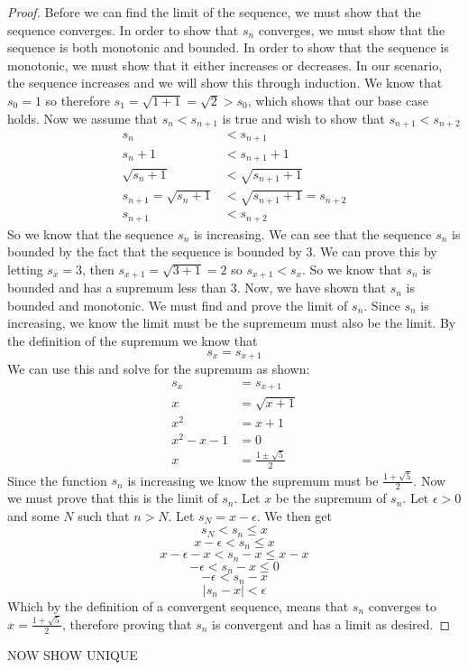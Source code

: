 \begin{proof}
Before we can find the limit of the sequence, we must show that the sequence converges. In order to show that $s_n$ converges, we must show that the sequence is both monotonic and bounded. In order to show that the sequence is monotonic, we must show that it either increases or decreases. In our scenario, the sequence increases and we will show this through induction. We know that $s_0 = 1$ so therefore $s_1 = \sqrt{1 + 1} = \sqrt{2} > s_0$, which shows that our base case holds. Now we assume that $s_n < s_{n+1}$ is true and wish to show that $s_{n+1} < s_{n+2}$
\begin{align*}
    s_n & < s_{n+1} \\
    s_n  + 1& < s_{n+1} + 1\\
    \sqrt{s_n  + 1}& < \sqrt{s_{n+1} + 1}\\
    s_{n+1}= \sqrt{s_n  + 1}& < \sqrt{s_{n+1} + 1} = s_{n+2}\\
    s_{n+1}& < s_{n+2}
\end{align*}
So we know that the sequence $s_n$ is increasing. We can see that the sequence $s_n$ is bounded by the fact that the sequence is bounded by 3. We can prove this by letting $s_x = 3$, then $s_{x+1} = \sqrt{3 + 1} = 2$ so $s_{x+1} < s_x$.
So we know that $s_n$ is bounded and has a supremum less than 3.
Now, we have shown that $s_n$ is bounded and monotonic. We must find and prove the limit of $s_n$. Since $s_n$ is increasing, we know the limit must be the supremeum must also be the limit.
By the definition of the supremum we know that $$s_x = s_{x+1}$$
We can use this and solve for the supremum as shown:
\begin{align*}
    s_x &= s_{x+1} \\
    x &= \sqrt{x + 1} \\
    x^2 &= x + 1 \\
    x^2 - x -1 & = 0\\
    x & = \frac{1 \pm \sqrt{5}}{2}
\end{align*}
Since the function $s_n$ is increasing we know the supremum must be $\frac{1 + \sqrt{5}}{2}$. Now we must prove that this is the limit of $s_n$. Let $x$ be the supremum of $s_n$. Let $\epsilon > 0$ and some $N$ such that $n>N$. Let $s_N = x - \epsilon$. We then get
$$s_N < s_n \leq x $$
$$ x - \epsilon < s_n \leq x $$
$$ x - \epsilon -x  < s_n - x \leq x - x $$
$$ - \epsilon  < s_n - x \leq 0$$
$$ - \epsilon  < s_n - x$$
$$|s_n - x| < \epsilon$$
Which by the definition of a convergent sequence, means that $s_n$ converges to $x = \frac{1 + \sqrt{5}}{2}$, therefore proving that $s_n$ is convergent and has a limit as desired.
\end{proof}

NOW SHOW UNIQUE